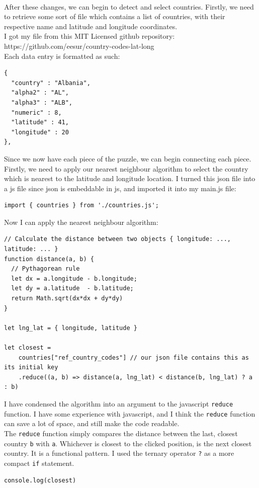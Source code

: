 \\ After these changes, we can begin to detect and select countries. Firstly, we need to retrieve some sort of file which contains a list of countries, with their respective name and latitude and longitude coordinates. \\
I got my file from this MIT Licensed github repository: https://github.com/eesur/country-codes-lat-long \\
Each data entry is formatted as such: \\
\begin{lstlisting}
{
  "country" : "Albania",
  "alpha2" : "AL",
  "alpha3" : "ALB",
  "numeric" : 8,
  "latitude" : 41,
  "longitude" : 20
},
\end{lstlisting}
Since we now have each piece of the puzzle, we can begin connecting each piece. Firstly, we need to apply our nearest neighbour algorithm to select the country which is nearest to the latitude and longitude location. I turned this json file into a js file since json is embeddable in js, and imported it into my main.js file:
\begin{lstlisting}
import { countries } from './countries.js';
\end{lstlisting}
Now I can apply the nearest neighbour algorithm:
\begin{lstlisting}
// Calculate the distance between two objects { longitude: ..., latitude: ... }
function distance(a, b) {
  // Pythagorean rule
  let dx = a.longitude - b.longitude;
  let dy = a.latitude  - b.latitude;
  return Math.sqrt(dx*dx + dy*dy)
}

let lng_lat = { longitude, latitude }

let closest =
    countries["ref_country_codes"] // our json file contains this as its initial key
    .reduce((a, b) => distance(a, lng_lat) < distance(b, lng_lat) ? a : b)
\end{lstlisting}
I have condensed the algorithm into an argument to the javascript \verb|reduce| function. I have some experience with javascript, and I think the \verb|reduce| function can save a lot of space, and still make the code readable. \\
The \verb|reduce| function simply compares the distance between the last, closest country \verb|b| with \verb|a|. Whichever is closest to the clicked position, is the next closest country. It is a functional pattern. I used the ternary operator \verb|?| as a more compact \verb|if| statement.
\begin{lstlisting}
console.log(closest)
\end{lstlisting}
